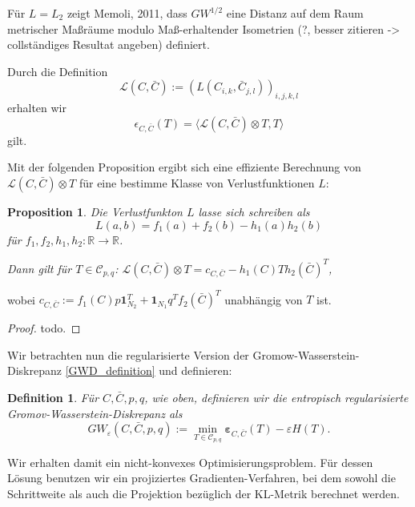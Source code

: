 \documentclass[twoside, 11pt,a4paper]{article}
\newtheorem{proposition}[theorem]{Proposition}
\newtheorem{definition}[theorem]{Definition}
\numberwithin{equation}{section}
\begin{document}
	Für $L=L_2 $ zeigt Memoli, 2011, dass $GW^{1/2}$ eine Distanz auf dem Raum metrischer Maßräume modulo Maß-erhaltender Isometrien (?, besser zitieren -> collständiges Resultat angeben) definiert.
	
	Durch die Definition 
	\begin{equation}
		\mathcal{L} (C, \bar{C}):= (L(C_{i,k}, \bar{C}_{j,l}))_{i,j,k,l}
	\end{equation}
	erhalten wir
	\begin{equation}
		\mathcal{\epsilon}_{C, \bar{C}}(T) = \langle \mathcal{L} (C, \bar{C}) \otimes T, T\rangle
	\end{equation}
	gilt.
	
	Mit der folgenden Proposition ergibt sich eine effiziente Berechnung von $\mathcal{L} (C, \bar{C}) \otimes T$ für eine bestimme Klasse von Verlustfunktionen $L$:
	
	\begin{proposition}
		Die Verlustfunkton $L$ lasse sich schreiben als 
		\begin{equation}
			L(a,b) = f_1(a) + f_2(b) - h_1(a)h_2(b) \label{eq:L_darstellung}
		\end{equation}
		für $f_1, f_2,h_1, h_2:\mathbb{R} \to \mathbb{R}$.
		
		Dann gilt für $T \in \mathcal{C}_{p,q}$:
		$\mathcal{L} (C, \bar{C}) \otimes T = c_{C, \bar{C}} - h_1(C)Th_2(\bar{C})^T$,
	\end{proposition} 
	wobei $c_{C, \bar{C}}:= f_1(C)p \boldsymbol{1}_{N_2}^T + \boldsymbol{1}_{N_1}q^Tf_2(\bar{C})^T$ unabhängig von $T$ ist.
	
	\begin{proof}
		todo.
	\end{proof}

	Wir betrachten nun die regularisierte Version der Gromow-Wasserstein-Diskrepanz \ref{GWD_definition} und definieren:
	
	\begin{definition}
		Für $C, \bar{C}, p, q$, wie oben, definieren wir die entropisch regularisierte Gromov-Wasserstein-Diskrepanz als 
		\begin{equation}
			GW_{\varepsilon}(C,\bar{C}, p, q):=\min_{T \in \mathcal{C}_{p, q}} \boldsymbol{\varepsilon}_{C, \bar{C}}(T) -\varepsilon H(T).
		\end{equation}
	\end{definition}
	
	Wir erhalten damit ein nicht-konvexes Optimisierungsproblem. Für dessen Lösung benutzen wir ein projiziertes Gradienten-Verfahren, bei dem sowohl die Schrittweite als auch die Projektion bezüglich der KL-Metrik berechnet werden.
	
\end{document}
